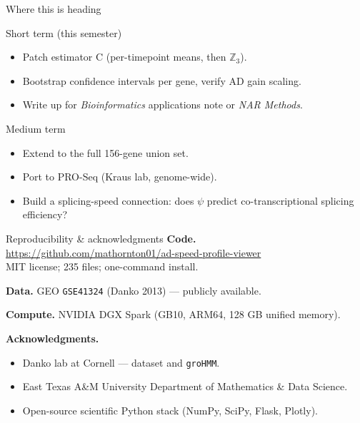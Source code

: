 \documentclass[aspectratio=169,10pt]{beamer}
\begin{document}
\begin{frame}{Where this is heading}
\begin{block}{Short term (this semester)}
\begin{itemize}
  \item Patch estimator C (per-timepoint means, then $\mathbb{Z}_3$).
  \item Bootstrap confidence intervals per gene, verify AD gain scaling.
  \item Write up for \emph{Bioinformatics} applications note or
        \emph{NAR Methods}.
\end{itemize}
\end{block}

\begin{block}{Medium term}
\begin{itemize}
  \item Extend to the full 156-gene union set.
  \item Port to PRO-Seq (Kraus lab, genome-wide).
  \item Build a splicing-speed connection: does $\psi$ predict
        co-transcriptional splicing efficiency?
\end{itemize}
\end{block}
\end{frame}

\begin{frame}{Reproducibility \& acknowledgments}
\textbf{Code.}\\
\url{https://github.com/mathornton01/ad-speed-profile-viewer} \\
MIT license; 235 files; one-command install.

\medskip
\textbf{Data.}
GEO \texttt{GSE41324} (Danko 2013) --- publicly available.

\medskip
\textbf{Compute.} NVIDIA DGX Spark (GB10, ARM64, 128 GB unified memory).

\medskip
\textbf{Acknowledgments.}
\begin{itemize}\small
  \item Danko lab at Cornell --- dataset and \texttt{groHMM}.
  \item East Texas A\&M University
        Department of Mathematics \& Data Science.
  \item Open-source scientific Python stack
        (NumPy, SciPy, Flask, Plotly).
\end{itemize}
\end{frame}
\end{document}
